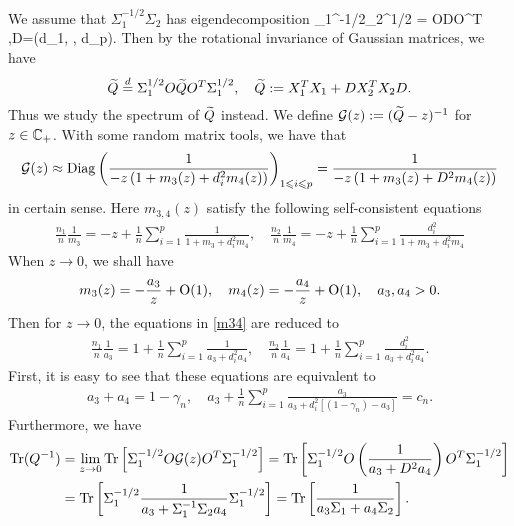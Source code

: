 We assume that $ \Sigma_1^{-1/2}\Sigma_2$ has eigendecomposition
\be  \label{eigen}
\Sigma_1^{-1/2}\Sigma_2^{1/2} = ODO^T ,\quad D=(d_1, \cdots, d_p).
\ee
Then by the rotational invariance of Gaussian matrices, we have
$$\widetilde Q \overset{d}{=}\Sigma_1^{1/2} O \widetilde Q O^T \Sigma_1^{1/2},\quad \widetilde Q:=   X_1^T X_1  + D X_2^T X_2 D .$$
Thus we study the spectrum of $\widetilde Q$ instead. We define $\mathcal G(z):= (\widetilde Q-z)^{-1}$ for $z\in \mathbb{C}_+$. With some random matrix tools, we have that 
$$\mathcal G(z) \approx \operatorname{Diag}\left( \frac{1}{-z\left( 1+ m_3(z) + d_i^2 m_4(z)\right)}\right)_{1\leqslant i \leqslant p}= \frac{1}{-z\left( 1+ m_3(z) + D^2 m_4(z)\right)} $$
{\cob in certain sense}. Here $m_{3,4}(z)$ satisfy the following self-consistent equations
\begin{align}\label{m34}
\frac{n_1}{n}\frac1{m_3} = - z +\frac1n\sum_{i=1}^p \frac1{  1+m_3 + d_i^2m_4  } ,\quad \frac{n_2}{n}\frac1{m_4} = - z +\frac1n\sum_{i=1}^p \frac{d_i^2 }{  1+m_3 + d_i^2m_4  } 
\end{align}
When $z\to 0$, we shall have
$$m_3(z)= - \frac{a_3}{z} + \operatorname{O}(1), \quad m_4(z)= - \frac{a_4}{z} + \operatorname{O}(1),\quad a_3,a_4>0.$$
Then for $z\to0$, the equations in \eqref{m34} are reduced to
\begin{align}\label{m35}
\frac{n_1}{n}\frac{1}{a_3} = 1 +\frac1n\sum_{i=1}^p \frac{1}{a_3 + d_i^2a_4  } ,\quad \frac{n_2}{n}\frac1{a_4} = 1 +\frac1n\sum_{i=1}^p \frac{d_i^2 }{  a_3 + d_i^2 a_4 }. 
\end{align}
First, it is easy to see that these equations are equivalent to
\begin{align} a_3 + a_4 = 1- \gamma_n, \quad a_3 +\frac1n\sum_{i=1}^p \frac{a_3}{a_3 + d_i^2[(1-\gamma_n)-a_3]  }=c_n  .\end{align}
Furthermore, we have
\begin{align*}
\operatorname{Tr} (Q^{-1}) &= \lim_{z\to 0}\operatorname{Tr} \left[\Sigma_1^{-1/2} O \mathcal G(z)O^T \Sigma_1^{-1/2}\right]
=\operatorname{Tr} \left[\Sigma_1^{-1/2} O  \left( \frac{1}{a_3 + D^2 a_4 }\right) O^T \Sigma_1^{-1/2}\right] \\
&=\operatorname{Tr} \left[\Sigma_1^{-1/2}  \frac{1}{a_3+ \Sigma_1^{-1}\Sigma_2 a_4} \Sigma_1^{-1/2}\right]=\operatorname{Tr} \left[ \frac{1}{a_3\Sigma_1 + a_4\Sigma_2 } \right].
\end{align*}

